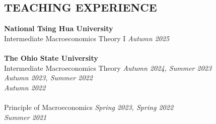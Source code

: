 \documentclass[11pt]{res} %
\begin{document}
\begin{resume}


\section{TEACHING EXPERIENCE}%
\label{sec:teaching_experience}
\vspace{8pt} %
{\bf National Tsing Hua University} \\
Intermediate Macroeconomics Theory I \hspace*{\fill} \textit{Autumn 2025} \\
\\
{\bf The Ohio State University} \\
Intermediate Macroeconomics Theory \hspace*{\fill} \textit{Autumn 2024, Summer 2023} \\
\hspace*{\fill} \textit{Autumn 2023, Summer 2022} \\
\hspace*{\fill} \textit{Autumn 2022} \\
\\
Principle of Macroeconomics \hspace*{\fill} \textit{Spring 2023, Spring 2022} \\
\hspace*{\fill} \textit{Summer 2021} \\


\end{resume}
\end{document}
